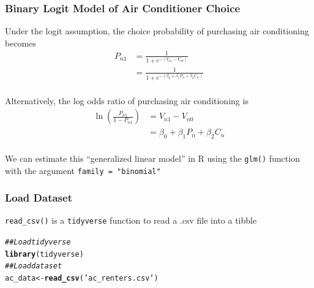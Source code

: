 \documentclass{beamer}\usepackage[]{graphicx}\usepackage[]{color}
\makeatletter
\newcommand{\hlstr}[1]{\textcolor[rgb]{0.192,0.494,0.8}{#1}}%
\newcommand{\hlcom}[1]{\textcolor[rgb]{0.678,0.584,0.686}{\textit{#1}}}%
\newcommand{\hlstd}[1]{\textcolor[rgb]{0.345,0.345,0.345}{#1}}%
\newcommand{\hlkwb}[1]{\textcolor[rgb]{0.69,0.353,0.396}{#1}}%
\newcommand{\hlkwd}[1]{\textcolor[rgb]{0.737,0.353,0.396}{\textbf{#1}}}%
\newenvironment{kframe}{%
 \def\at@end@of@kframe{}%
 \ifinner\ifhmode%
  \def\at@end@of@kframe{\end{minipage}}%
  \begin{minipage}{\columnwidth}%
 \fi\fi%
 \def\FrameCommand##1{\hskip\@totalleftmargin \hskip-\fboxsep
 \colorbox{shadecolor}{##1}\hskip-\fboxsep
     \hskip-\linewidth \hskip-\@totalleftmargin \hskip\columnwidth}%
 \MakeFramed {\advance\hsize-\width
   \@totalleftmargin\z@ \linewidth\hsize
   \@setminipage}}%
 {\par\unskip\endMakeFramed%
 \at@end@of@kframe}
\newenvironment{knitrout}{}{} %
\makeatother
\begin{document}
\begin{frame}\frametitle{Binary Logit Model of Air Conditioner Choice}
    Under the logit assumption, the choice probability of purchasing air conditioning becomes
    \begin{align*}
        P_{n1} & = \frac{1}{1 + e^{-(V_{n1} - V_{n0})}} \\
        & = \frac{1}{1 + e^{-(\beta_0 + \beta_1 P_n + \beta_2 C_n)}}
    \end{align*} \\
    \vspace{2ex}
    Alternatively, the log odds ratio of purchasing air conditioning is
    \begin{align*}
        \ln \left( \frac{P_{n1}}{1 - P_{n1}} \right) & = V_{n1} - V_{n0} \\
        & = \beta_0 + \beta_1 P_n + \beta_2 C_n
    \end{align*} \\
    \vspace{2ex}
    We can estimate this ``generalized linear model'' in R using the \texttt{glm()} function with the argument \texttt{family = "binomial"}
\end{frame}

\begin{frame}[fragile]\frametitle{Load Dataset}
    \texttt{read\_csv()} is a \texttt{tidyverse} function to read a .csv file into a tibble
\begin{knitrout}\footnotesize
{}\color{fgcolor}\begin{kframe}
\begin{alltt}
\hlcom{## Load tidyverse}
\hlkwd{library}\hlstd{(tidyverse)}
\hlcom{## Load dataset}
\hlstd{ac_data} \hlkwb{<-} \hlkwd{read_csv}\hlstd{(}\hlstr{'ac_renters.csv'}\hlstd{)}
\end{alltt}
\end{kframe}
\end{knitrout}
\end{frame}
\end{document}
